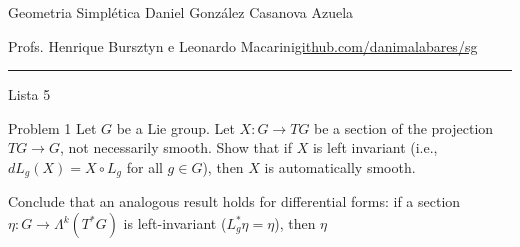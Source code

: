 
%



\begin{minipage}{\textwidth}
	\begin{minipage}{1\textwidth}
		Geometria Simpl\'etica \hfill Daniel González Casanova Azuela
		
		{\small Profs. Henrique Bursztyn e Leonardo Macarini\hfill\href{https://github.com/danimalabares/sg}{github.com/danimalabares/sg}}
	\end{minipage}
\end{minipage}\vspace{.2cm}\hrule

\vspace{10pt}
{\huge Lista 5}

\tableofcontents

\begin{idea1}{Problem 1}\leavevmode
	Let  $G$ be a Lie group. Let $X:G\longrightarrow TG$ be a section of the projection $TG\longrightarrow G$, not necessarily smooth. Show that if  $X$ is left invariant (i.e., $dL_g(X)=X\circ L_g$ for all $g\in G$), then $X$ is automatically smooth.

	Conclude that an analogous result holds for differential forms: if a section $\eta:G\longrightarrow \Lambda^{k}(T^*G)$ is left-invariant ($L^*_g\eta=\eta$), then $\eta$
\end{idea1}




